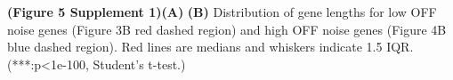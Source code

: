 \textbf{(Figure 5 Supplement 1)}\textbf{(A)} \textbf{(B)} Distribution of gene
lengths for low OFF noise genes (Figure 3B red dashed region) and high OFF noise genes (Figure 4B
blue dashed region). Red lines are medians and whiskers indicate 1.5 IQR. (***:p<1e-100, Student’s
t-test.)